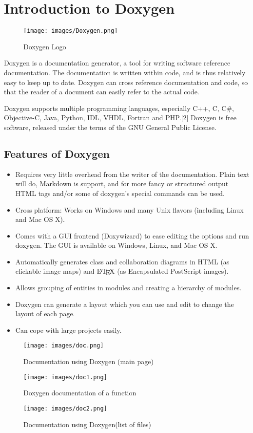 \section{Introduction to Doxygen}
\begin{figure}[h]
\centering \texttt{[image: images/Doxygen.png]}
\caption{Doxygen Logo}
\end{figure}
Doxygen is a documentation generator, a tool for writing software reference 
documentation. The documentation is written within code, and is thus 
relatively easy to keep up to date. Doxygen can cross reference 
documentation and code, so that the reader of a document can easily 
refer to the actual code.

Doxygen supports multiple programming languages, especially C++, C, 
C\#, Objective-C, Java, Python, IDL, VHDL, Fortran and PHP.[2] Doxygen
 is free software, released under the terms of the GNU General Public 
License.\\

\subsection{Features of Doxygen}
\begin{itemize}
\item Requires very little overhead from the writer of the documentation. 
Plain text will do, Markdown is support, and for more fancy or structured 
output HTML tags and/or some of doxygen's special commands can be used.
\item Cross platform: Works on Windows and many Unix flavors (including 
Linux and Mac OS X).
\item Comes with a GUI frontend (Doxywizard) to ease editing the options 
and run doxygen. The GUI is available on Windows, Linux, and Mac OS X.
\item Automatically generates class and collaboration diagrams in HTML 
(as clickable image maps) and $\mbox{\LaTeX}$ (as Encapsulated PostScript 
images).
\item Allows grouping of entities in modules and creating a hierarchy 
of modules.
\item Doxygen can generate a layout which you can use and edit to change 
the layout of each page.
\item Can cope with large projects easily.
\end{itemize}

\begin{figure}[H]
\centering \texttt{[image: images/doc.png]}
\caption{Documentation using Doxygen (main page)}
\end{figure}


\begin{figure}[H]
\centering \texttt{[image: images/doc1.png]}
\caption{Doxygen documentation of a function}
\end{figure}
\begin{figure}[H]
\centering \texttt{[image: images/doc2.png]}
\caption{Documentation using Doxygen(list of files)}
\end{figure}


